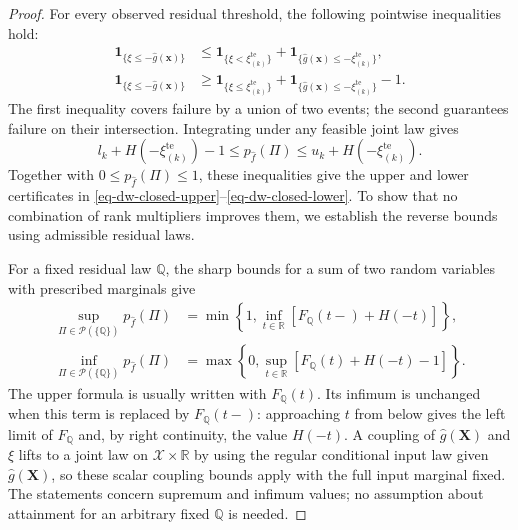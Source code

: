 \documentclass[review,11pt,3p,authoryear,nopreprintline]{elsarticle}
\begin{document}
\begin{proof}
  For every observed residual threshold, the following pointwise inequalities hold:
  \begin{align}
    \mathbf1_{\{\xi\le-\hat g(\bm x)\}}
    &\le\mathbf1_{\{\xi<\xi_{(k)}^{\mathrm{te}}\}}
      +\mathbf1_{\{\hat g(\bm x)\le-\xi_{(k)}^{\mathrm{te}}\}},
      \label{eq-upper-threshold-certificate}\\
    \mathbf1_{\{\xi\le-\hat g(\bm x)\}}
    &\ge\mathbf1_{\{\xi\le\xi_{(k)}^{\mathrm{te}}\}}
      +\mathbf1_{\{\hat g(\bm x)\le-\xi_{(k)}^{\mathrm{te}}\}}-1.
      \label{eq-lower-threshold-certificate}
  \end{align}
  The first inequality covers failure by a union of two events; the second guarantees failure on their intersection. Integrating under any feasible joint law gives
  \begin{equation}
    l_k+H\left(-\xi_{(k)}^{\mathrm{te}}\right)-1
    \le p_{\hat f}(\Pi)
    \le u_k+H\left(-\xi_{(k)}^{\mathrm{te}}\right).
    \label{eq-rankwise-failure-bounds}
  \end{equation}
  Together with $0\le p_{\hat f}(\Pi)\le1$, these inequalities give the upper and lower certificates in \eqref{eq-dw-closed-upper}--\eqref{eq-dw-closed-lower}. To show that no combination of rank multipliers improves them, we establish the reverse bounds using admissible residual laws.

  For a fixed residual law $\mathbb Q$, the sharp bounds for a sum of two random variables with prescribed marginals give \citep{M82,Z.R25}
  \begin{align}
    \sup_{\Pi\in\mathcal P(\{\mathbb Q\})}p_{\hat f}(\Pi)
    &=\min\left\{1,\inf_{t\in\mathbb R}\left[F_{\mathbb Q}(t-)+H(-t)\right]\right\},
      \label{eq-fixed-residual-upper}\\
    \inf_{\Pi\in\mathcal P(\{\mathbb Q\})}p_{\hat f}(\Pi)
    &=\max\left\{0,\sup_{t\in\mathbb R}\left[F_{\mathbb Q}(t)+H(-t)-1\right]\right\}.
      \label{eq-fixed-residual-lower}
  \end{align}
  The upper formula is usually written with $F_{\mathbb Q}(t)$. Its infimum is unchanged when this term is replaced by $F_{\mathbb Q}(t-)$: approaching $t$ from below gives the left limit of $F_{\mathbb Q}$ and, by right continuity, the value $H(-t)$. A coupling of $\hat g(\bm X)$ and $\xi$ lifts to a joint law on $\mathcal X\times\mathbb R$ by using the regular conditional input law given $\hat g(\bm X)$, so these scalar coupling bounds apply with the full input marginal fixed. The statements concern supremum and infimum values; no assumption about attainment for an arbitrary fixed $\mathbb Q$ is needed.


\end{proof}
\end{document}
